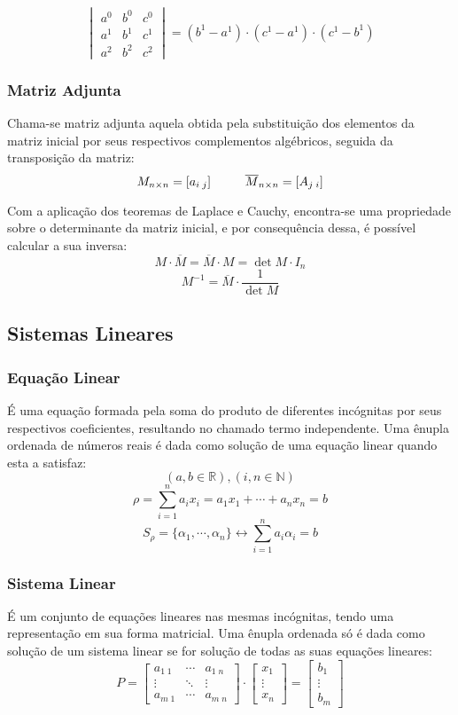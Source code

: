         \eg
        \[ \begin{vmatrix} a^0 & b^0 & c^0 \\ a^1 & b^1 & c^1 \\ a^2 & b^2 & c^2 \end{vmatrix} = (b^1 - a^1) \cdot (c^1 - a^1) \cdot (c^1 - b^1) \]
    \subsubsection{Matriz Adjunta}
        Chama-se matriz adjunta aquela obtida pela substituição dos elementos da matriz inicial por seus respectivos complementos algébricos, seguida da transposição da matriz:
        \[ M_{n \times n} = [a_{i \; j}] \hphantom{---} \overline{M}_{n \times n} = [A_{j \; i}] \]
        
        Com a aplicação dos teoremas de Laplace e Cauchy, encontra-se uma propriedade sobre o determinante da matriz inicial, e por consequência dessa, é possível calcular a sua inversa:
        \[ M \cdot \overline{M} = \overline{M} \cdot M = \det{M} \cdot I_ n \]
        \[ M^{-1} = \overline{M} \cdot \frac{1}{\det{M}} \]
\subsection{Sistemas Lineares}
    \subsubsection{Equação Linear}
        É uma equação formada pela soma do produto de diferentes incógnitas por seus respectivos coeficientes, resultando no chamado termo independente. Uma ênupla ordenada de números reais é dada como solução de uma equação linear quando esta a satisfaz:
        \[ (a, b \in \mathbb{R}), (i, n \in \mathbb{N}) \]
        \[ \rho = \displaystyle\sum_{i=1}^{n} {a_i x_i} = a_1 x_1 + \cdots + a_n x_n = b \]
        \[ S_{\rho} = \{\alpha_1, \cdots, \alpha_n\} \leftrightarrow \displaystyle\sum_{i=1}^{n} {a_i \alpha_i} = b \]
    \subsubsection{Sistema Linear}
        É um conjunto de equações lineares nas mesmas incógnitas, tendo uma representação em sua forma matricial. Uma ênupla ordenada só é dada como solução de um sistema linear se for solução de todas as suas equações lineares:
        \[ P = \begin{bmatrix} a_{1 \; 1} & \cdots & a_{1 \; n} \\ \vdots & \ddots & \vdots \\ a_{m \; 1} & \cdots & a_{m \; n} \end{bmatrix} \cdot \begin{bmatrix} x_1 \\ \vdots \\ x_n \end{bmatrix} = \begin{bmatrix} b_1 \\ \vdots \\ b_m \end{bmatrix} \]

